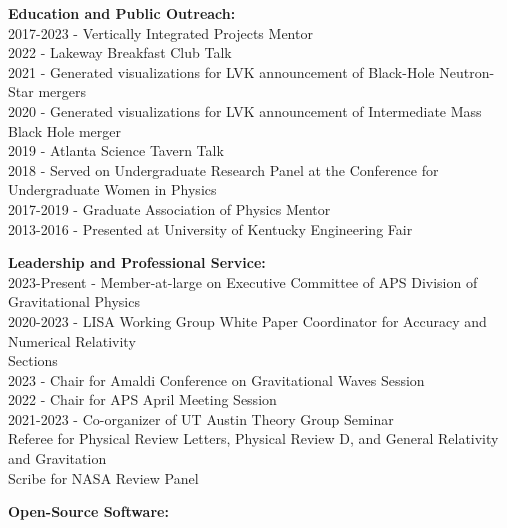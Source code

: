 \documentclass[11pt]{article}
\begin{document}
\begin{flushleft}
  \textbf{Education and Public Outreach:}\\
  2017-2023 - Vertically Integrated Projects Mentor\\
  2022 - Lakeway Breakfast Club Talk\\
  2021 - Generated visualizations for LVK announcement of Black-Hole Neutron-Star mergers\\
  2020 - Generated visualizations for LVK announcement of Intermediate Mass Black Hole merger\\
  2019 - Atlanta Science Tavern Talk\\
  2018 - Served on Undergraduate Research Panel at the Conference for Undergraduate Women in Physics\\
  2017-2019 - Graduate Association of Physics Mentor\\
  2013-2016 - Presented at University of Kentucky Engineering Fair\\

  \vspace{8px}

  \textbf{Leadership and Professional Service: }\\
  2023-Present - Member-at-large on Executive Committee of APS Division of Gravitational Physics\\
  2020-2023 - LISA Working Group White Paper Coordinator for Accuracy and Numerical Relativity\\ \hspace{58px}Sections \\
  2023 - Chair for Amaldi Conference on Gravitational Waves Session\\
  2022 - Chair for APS April Meeting Session\\
  2021-2023 - Co-organizer of UT Austin Theory Group Seminar\\
  Referee for Physical Review Letters, Physical Review D,  and General Relativity and Gravitation\\
  Scribe for NASA Review Panel\\
  
  \vspace{8px}
  
  \textbf{Open-Source Software:}\\
  \\
  
  \vspace{8px}


\end{flushleft}
\end{document}
